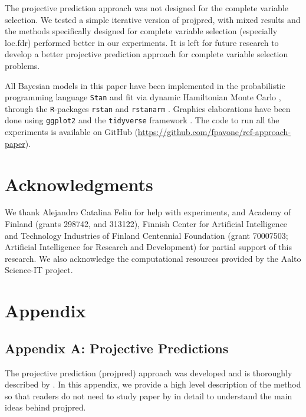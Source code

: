 \documentclass[a4]{article}
\theoremstyle{definition}
\begin{document}
The projective prediction approach was not designed for the complete
variable selection. We tested a simple iterative version of projpred,
with mixed results and the methods specifically designed for complete
variable selection (especially loc.fdr) performed better in our
experiments. It is left for future research to develop 
a better projective prediction approach for complete variable
selection problems.

All Bayesian models in this paper have been implemented in
the probabilistic programming language \texttt{Stan}
\citep{paper:stan} and fit via dynamic Hamiltonian Monte Carlo
\citep{hoffman2014no,betancourt2017conceptual}, through the \texttt{R}-packages 
\texttt{rstan} \citep{Rrstan} and \texttt{rstanarm} \citep{Rrstanarm}.
Graphics elaborations have been done using \texttt{ggplot2} \citep{Rggplot2}
and the \texttt{tidyverse} framework \citep{Rtidyverse}.
The code to run all
the experiments is available on GitHub
(\url{https://github.com/fpavone/ref-approach-paper}).

\section*{Acknowledgments}

We thank Alejandro Catalina Feliu for help with experiments, and
Academy of Finland (grants 298742, and 313122), Finnish Center for
Artificial Intelligence and Technology Industries of Finland
Centennial Foundation (grant 70007503; Artificial Intelligence for
Research and Development) for partial support of this research. We
also acknowledge the computational resources provided by the Aalto
Science-IT project.
 


\appendix


\section*{Appendix}

\subsection*{Appendix A: Projective Predictions}

The projective prediction (projpred) approach was developed and is thoroughly
 described by \cite{paper:projpred}. In this appendix, we provide a high level
  description of the method so that readers do not need to study paper by \cite{paper:projpred} in detail
to understand the main ideas behind projpred.
\end{document}
